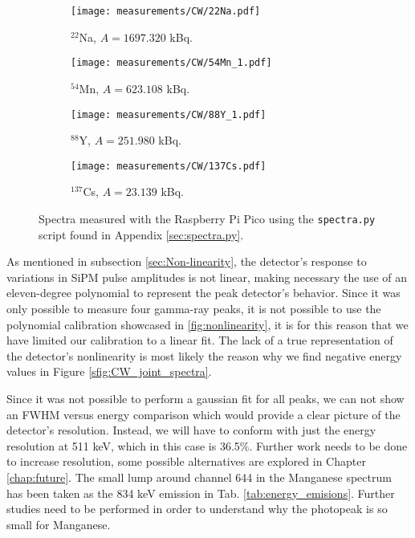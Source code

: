 \begin{figure}[H]
  \begin{subfigure}[t]{0.48\textwidth}
    \centering
    \texttt{[image: measurements/CW/22Na.pdf]}
    \caption{\label{sfig:CW_22Na}$^{22}$Na, $A=1697.320$ kBq.}
  \end{subfigure}
  \hfill
  \begin{subfigure}[t]{0.48\textwidth}
    \centering
    \texttt{[image: measurements/CW/54Mn\_1.pdf]}
    \caption{\label{sfig:C2_54Mn}$^{54}$Mn, $A=623.108$ kBq.}
  \end{subfigure}
  \medskip
  \begin{subfigure}[t]{0.48\textwidth}
    \centering
    \texttt{[image: measurements/CW/88Y\_1.pdf]}
    \caption{\label{sfig:CW_88Y}$^{88}$Y, $A=251.980$ kBq.}
  \end{subfigure}
  \hfill
  \begin{subfigure}[t]{0.48\textwidth}
    \centering
    \texttt{[image: measurements/CW/137Cs.pdf]}
    \caption{\label{sfig:CW_137Cs}$^{137}$Cs, $A=23.139$ kBq.}
  \end{subfigure}
  \caption{\label{fig:CW_spectra}Spectra measured with the Raspberry Pi Pico using the \texttt{spectra.py} script found in Appendix \ref{sec:spectra.py}.}
\end{figure}
As mentioned in subsection \ref{sec:Non-linearity}, the detector's response to variations in SiPM pulse amplitudes is not linear, making necessary the use of an eleven-degree polynomial to represent the peak detector's behavior. Since it was only possible to measure four gamma-ray peaks, it is not possible to use the polynomial calibration showcased in \ref{fig:nonlinearity}, it is for this reason that we have limited our calibration to a linear fit. The lack of a true representation of the detector's nonlinearity is most likely the reason why we find negative energy values in Figure \ref{sfig:CW_joint_spectra}.

Since it was not possible to perform a gaussian fit for all peaks, we can not show an FWHM versus energy comparison which would provide a clear picture of the detector's resolution. Instead, we will have to conform with just the energy resolution at 511 keV, which in this case is 36.5$\%$. Further work needs to be done to increase resolution, some possible alternatives are explored in Chapter \ref{chap:future}. The small lump around channel 644 in the Manganese spectrum has been taken as the 834 keV emission in Tab. \ref{tab:energy_emisions}. Further studies need to be performed in order to understand why the photopeak is so small for Manganese.

